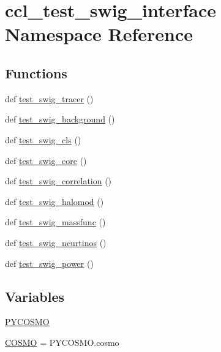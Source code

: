 \hypertarget{namespaceccl__test__swig__interface}{}\section{ccl\+\_\+test\+\_\+swig\+\_\+interface Namespace Reference}
\label{namespaceccl__test__swig__interface}
\subsection*{Functions}
\begin{DoxyCompactItemize}
\item 
def \mbox{\hyperlink{namespaceccl__test__swig__interface_a2aa841b1cc680b2bf85b712c9c1ad9aa}{test\+\_\+swig\+\_\+tracer}} ()
\item 
def \mbox{\hyperlink{namespaceccl__test__swig__interface_a0b9a0e9ddaaa7a37c01c289f200d9d63}{test\+\_\+swig\+\_\+background}} ()
\item 
def \mbox{\hyperlink{namespaceccl__test__swig__interface_ac0a01891ea854bac607860713979d767}{test\+\_\+swig\+\_\+cls}} ()
\item 
def \mbox{\hyperlink{namespaceccl__test__swig__interface_a896334ea462ebbdeb776f6e4bb92f581}{test\+\_\+swig\+\_\+core}} ()
\item 
def \mbox{\hyperlink{namespaceccl__test__swig__interface_a14c0226455a9c104e18098977d03bf6a}{test\+\_\+swig\+\_\+correlation}} ()
\item 
def \mbox{\hyperlink{namespaceccl__test__swig__interface_a8e2642dc39a7ea80575828fd9163cd11}{test\+\_\+swig\+\_\+halomod}} ()
\item 
def \mbox{\hyperlink{namespaceccl__test__swig__interface_a1211737259a7986dadf7e2ecb9d7c7e2}{test\+\_\+swig\+\_\+massfunc}} ()
\item 
def \mbox{\hyperlink{namespaceccl__test__swig__interface_a2c48b417c0fcc2e6db75bbfd02516841}{test\+\_\+swig\+\_\+neurtinos}} ()
\item 
def \mbox{\hyperlink{namespaceccl__test__swig__interface_a1bcdfd3c1b4ea96915fbdc8dc2960dec}{test\+\_\+swig\+\_\+power}} ()
\end{DoxyCompactItemize}
\subsection*{Variables}
\begin{DoxyCompactItemize}
\item 
\mbox{\hyperlink{namespaceccl__test__swig__interface_abc24f5e95297d21e2f05fc865e056c99}{P\+Y\+C\+O\+S\+MO}}
\item 
\mbox{\hyperlink{namespaceccl__test__swig__interface_aa47ecf47fee76d3eba81a5d1a455beb0}{C\+O\+S\+MO}} = P\+Y\+C\+O\+S\+M\+O.\+cosmo
\end{DoxyCompactItemize}


